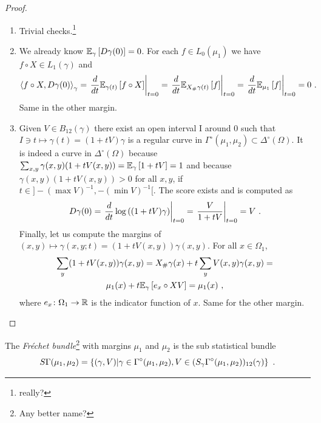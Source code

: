 \documentclass[runningheads]{llncs}
\begin{document}
\begin{proof} \ 
  \begin{enumerate}
  \item Trivial checks.\footnote{really?}
  \item We already know ${\operatorname{\mathbb E}}_{\gamma}\left[D\gamma(0)\right] = 0$. For each $f \in L_0(\mu_1)$ we have $f \circ X \in L_1(\gamma)$ and 
%
    \begin{equation*}
    \left\langle f \circ X , D\gamma(0) \right\rangle_{\gamma} = \left. \frac{d}{dt} {\operatorname{\mathbb E}}_{\gamma(t)}\left[f \circ X\right] \right|_{t=0} = \left. \frac{d}{dt} {\operatorname{\mathbb E}}_{X_{\#}\gamma(t)}\left[f\right] \right|_{t=0} = \left. \frac{d}{dt} {\operatorname{\mathbb E}}_{\mu_1}\left[f\right] \right|_{t=0} = 0 \ .
    \end{equation*}
%
Same in the other margin.
  \item Given $V \in B_{12}(\gamma)$ there exist an open interval I around 0 such that $I \ni t \mapsto \gamma(t) = (1+tV)\gamma$ is a regular curve in $\Gamma^\circ(\mu_1,\mu_2) \subset \Delta^\circ(\Omega)$. It is indeed a curve in $\Delta^\circ(\Omega)$ because $\sum_{x,y} \gamma(x,y)(1+tV(x,y)) = {\operatorname{\mathbb E}}_{\gamma}\left[1+tV\right] = 1$ and because $\gamma(x,y)(1+tV(x,y)) > 0$ for all $x,y$, if $t \in ]- (\max V)^{-1}, - (\min V)^{-1}[$.  The score exists and is computed as
%
\    \begin{equation*}
     D\gamma(0) = \left.  \frac{d}{dt} \log\left( (1+tV)\gamma \right) \right|_{t=0} = \left. \frac V {1+tV} \right|_{t=0} = V \ .
    \end{equation*}
%
Finally, let us compute the margins of $(x,y) \mapsto \gamma(x,y;t) = (1+tV(x,y))\gamma(x,y)$. For all $x \in \Omega_1$,
%
\begin{multline*}
  \sum_y (1+tV(x,y))\gamma(x,y) = X_\# \gamma(x) + t \sum_y V(x,y)\gamma(x,y) = \\ \mu_1(x) + t {\operatorname{\mathbb E}}_{\gamma}\left[e_x\circ X V\right] = \mu_1(x) \ ,
\end{multline*}
%
where $e_x \colon \Omega_1 \to \mathbb R$ is the indicator function of $x$. Same for the other margin.
  \end{enumerate}
\end{proof}
%
\begin{definition}
The \emph{Fr\'echet bundle}\footnote{Any better name?} with margins $\mu_1$ and $\mu_2$ is the sub statistical bundle
%
\begin{equation*}
  S\Gamma(\mu_1,\mu_2) = \left\{ (\gamma,V) \middle| \gamma\in\Gamma^\circ(\mu_1,\mu_2),V \in (S_\gamma\Gamma^\circ(\mu_1,\mu_2))_{12}(\gamma) \right\} \ .
\end{equation*}
\end{definition}
\end{document}
